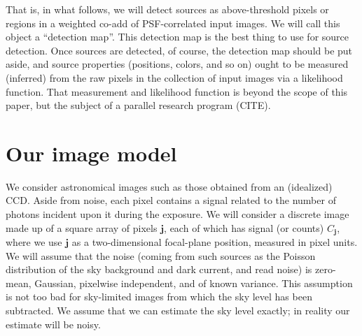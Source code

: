 \documentclass[letterpaper,preprint]{aastex}
\newcommand{\noise}{e}
\renewcommand{\vec}[1]{\boldsymbol{#1}}
\newcommand{\jvec}{\vec{j}}
\begin{document}


That is, in what follows, we will detect sources as above-threshold
pixels or regions in a weighted co-add of PSF-correlated input images.
We will call this object a ``detection map''.  This detection map is
the best thing to use for source detection.  Once sources are
detected, of course, the detection map should be put aside, and source
properties (positions, colors, and so on) ought to be measured
(inferred) from the raw pixels in the collection of input images via a
likelihood function.  That measurement and likelihood function is
beyond the scope of this paper, but the subject of a parallel research
program (CITE).

\section{Our image model}

We consider astronomical images such as those obtained from an
(idealized) CCD.  Aside from noise, each pixel contains a signal
related to the number of photons incident upon it during the exposure.
We will consider a discrete image made up of a square array of pixels
$\jvec$, each of which has signal (or counts) $C_{\jvec}$, where we
use $\jvec$ as a two-dimensional focal-plane position, measured in
pixel units.  We will assume that the noise (coming from such sources
as the Poisson distribution of the sky background and dark current,
and read noise) is zero-mean, Gaussian, pixelwise independent, and of
known variance.  This assumption is not too bad for sky-limited images
from which the sky level has been subtracted.
We assume that we can estimate the sky level
exactly; in reality our estimate will be noisy.

\end{document}
